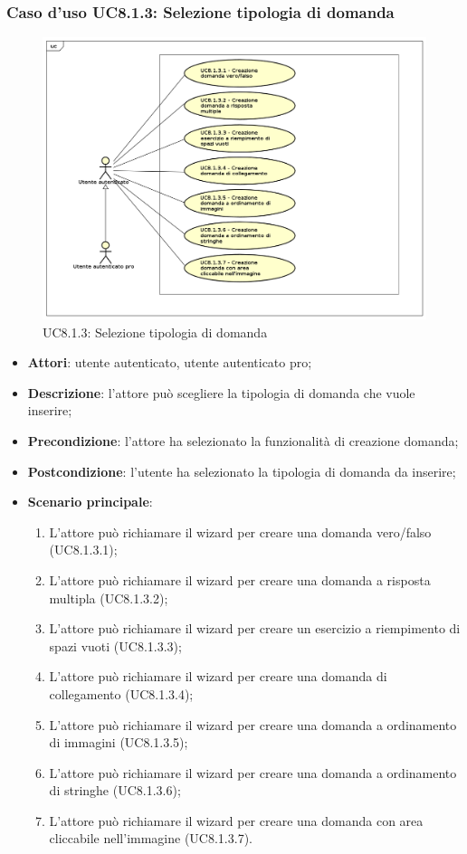 	\subsubsection{Caso d'uso UC8.1.3: Selezione tipologia di domanda}
	\label{UC8.1.3}
	\begin{figure}[h]
		\centering
			\includegraphics[scale=0.45,keepaspectratio]{UML/UC8_1_3.png}
		\caption{UC8.1.3: Selezione tipologia di domanda}
	\end{figure}
	\FloatBarrier
	\begin{itemize}
		\item
			\textbf{Attori}: utente autenticato, utente autenticato pro;
		\item
			\textbf{Descrizione}: l'attore può scegliere la tipologia di domanda che vuole inserire;
		\item		
			\textbf{Precondizione}: l'attore ha selezionato la funzionalità di creazione domanda;
		\item
			\textbf{Postcondizione}: l'utente ha selezionato la tipologia di domanda da inserire;
				\item \textbf{Scenario principale}: 
					\begin{enumerate}
					\item
					L'attore può richiamare il wizard per creare una domanda vero/falso (UC8.1.3.1);
					\item
					L'attore può richiamare il wizard per creare una domanda a risposta multipla (UC8.1.3.2);
					\item
					L'attore può richiamare il wizard per creare un esercizio a riempimento di spazi vuoti (UC8.1.3.3);
					\item
					L'attore può richiamare il wizard per creare una domanda di collegamento (UC8.1.3.4);
					\item
					L'attore può richiamare il wizard per creare una domanda a ordinamento di immagini (UC8.1.3.5);
					\item
					L'attore può richiamare il wizard per creare una domanda a ordinamento di stringhe (UC8.1.3.6);
					\item
					L'attore può richiamare il wizard per creare una domanda con area cliccabile nell'immagine (UC8.1.3.7).
	 			\end{enumerate}
	\end{itemize}

